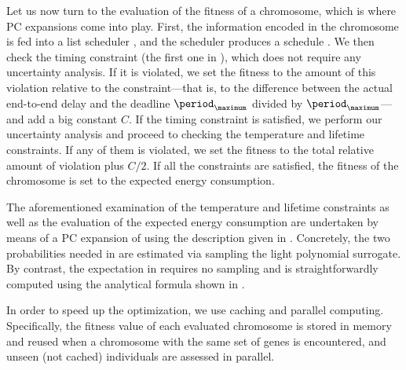 Let us now turn to the evaluation of the fitness of a chromosome, which is where
\ac{PC} expansions come into play. First, the information encoded in the
chromosome is fed into a list scheduler \cite{adam1974}, and the scheduler
produces a schedule \schedule. We then check the timing constraint (the first
one in ), which does not require any
uncertainty analysis. If it is violated, we set the fitness to the amount of
this violation relative to the constraint---that is, to the difference between
the actual end-to-end delay and the deadline $\period_\maximum$ divided by
$\period_\maximum$---and add a big constant $C$. If the timing constraint is
satisfied, we perform our uncertainty analysis and proceed to checking the
temperature and lifetime constraints. If any of them is violated, we set the
fitness to the total relative amount of violation plus $C / 2$. If all the
constraints are satisfied, the fitness of the chromosome is set to the expected
energy consumption.

The aforementioned examination of the temperature and lifetime constraints as
well as the evaluation of the expected energy consumption are undertaken by
means of a \ac{PC} expansion of  using the
description given in . Concretely, the two probabilities
needed in  are estimated via sampling the
light polynomial surrogate. By contrast, the expectation in
 requires no sampling and is
straightforwardly computed using the analytical formula shown in
.

\begin{remark}
In order to speed up the optimization, we use caching and parallel computing.
Specifically, the fitness value of each evaluated chromosome is stored in memory
and reused when a chromosome with the same set of genes is encountered, and
unseen (not cached) individuals are assessed in parallel.
\end{remark}
